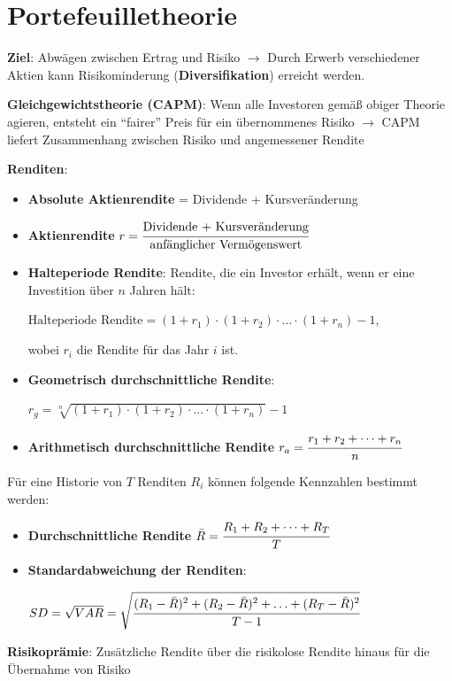 \section{Portefeuilletheorie}

\textbf{Ziel}: Abwägen zwischen Ertrag und Risiko 
$\rightarrow$ Durch Erwerb verschiedener Aktien kann Risikominderung (\textbf{Diversifikation}) erreicht werden.

\textbf{Gleichgewichtstheorie (CAPM)}: Wenn alle Investoren gemäß obiger Theorie agieren, entsteht ein \enquote{fairer} Preis für ein übernommenes Risiko $\rightarrow$ CAPM liefert Zusammenhang zwischen Risiko und angemessener Rendite

\textbf{Renditen}:
\begin{itemize}
	\item \textbf{Absolute Aktienrendite} = Dividende + Kursveränderung
	\item \textbf{Aktienrendite} $r = \cfrac{\text{Dividende + Kursveränderung}}{\text{anfänglicher Vermögenswert}}$
	\item \textbf{Halteperiode Rendite}: Rendite, die ein Investor erhält, wenn er eine Investition
	über $n$ Jahren hält:
	\begin{center}
		$\text{Halteperiode Rendite}=(1+r_1)\cdot(1+r_2)\cdot\ldots\cdot(1+r_n)-1$,
	\end{center}
	wobei $r_i$ die Rendite für das Jahr $i$ ist.
	\item \textbf{Geometrisch durchschnittliche Rendite}:
	\begin{center}
		 $r_g=\sqrt[n]{(1+r_1)\cdot(1+r_2)\cdot\ldots\cdot(1+r_n)}-1$
	\end{center}
	\item \textbf{Arithmetisch durchschnittliche Rendite} $r_a=\cfrac{r_1+r_2+\dots+r_n}{n}$
\end{itemize}
Für eine Historie von $T$ Renditen $R_i$ können folgende Kennzahlen bestimmt werden:
\begin{itemize}
	\item \textbf{Durchschnittliche Rendite} $\bar{R}=\cfrac{R_1+R_2+\dots+R_T}{T}$
	\item \textbf{Standardabweichung der Renditen}:
	\begin{center}
		$SD=\sqrt{VAR}=\sqrt{\cfrac{(R_1-\bar{R})^2+(R_2-\bar{R})^2+\ldots+(R_T-\bar{R})^2}{T-1}}$
	\end{center}
\end{itemize}

\textbf{Risikoprämie}: Zusätzliche Rendite über die risikolose Rendite hinaus für die Übernahme von Risiko\\

